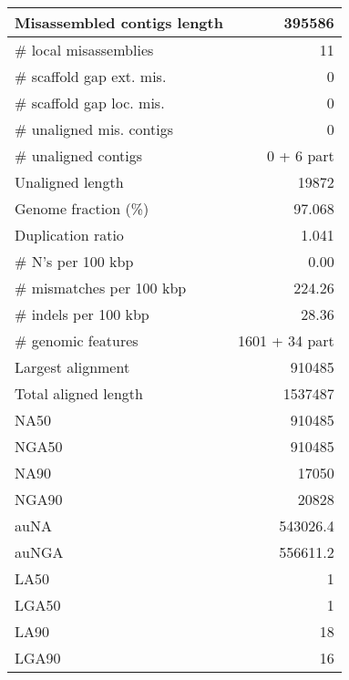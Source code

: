 \documentclass[12pt,a4paper]{article}
\begin{document}
\begin{table}[ht]
\begin{center}
\begin{tabular}{|l*{1}{|r}|}
Misassembled contigs length & 395586 \\ \hline
\# local misassemblies & 11 \\ \hline
\# scaffold gap ext. mis. & 0 \\ \hline
\# scaffold gap loc. mis. & 0 \\ \hline
\# unaligned mis. contigs & 0 \\ \hline
\# unaligned contigs & 0 + 6 part \\ \hline
Unaligned length & 19872 \\ \hline
Genome fraction (\%) & 97.068 \\ \hline
Duplication ratio & 1.041 \\ \hline
\# N's per 100 kbp & 0.00 \\ \hline
\# mismatches per 100 kbp & 224.26 \\ \hline
\# indels per 100 kbp & 28.36 \\ \hline
\# genomic features & 1601 + 34 part \\ \hline
Largest alignment & 910485 \\ \hline
Total aligned length & 1537487 \\ \hline
NA50 & 910485 \\ \hline
NGA50 & 910485 \\ \hline
NA90 & 17050 \\ \hline
NGA90 & 20828 \\ \hline
auNA & 543026.4 \\ \hline
auNGA & 556611.2 \\ \hline
LA50 & 1 \\ \hline
LGA50 & 1 \\ \hline
LA90 & 18 \\ \hline
LGA90 & 16 \\ \hline
\end{tabular}
\end{center}
\end{table}
\end{document}
